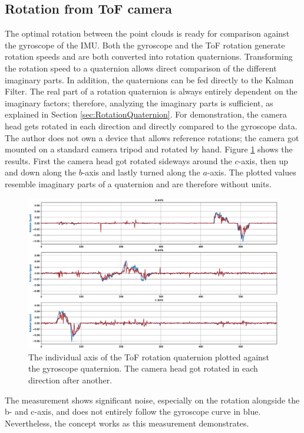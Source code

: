 \subsection{Rotation from ToF camera}
\label{sec:results_tof_rotation}
The optimal rotation between the point clouds is ready for comparison against the gyroscope of the IMU. Both the gyroscope and the ToF rotation generate rotation speeds and are both converted into rotation quaternions. Transforming the rotation speed to a quaternion allows direct comparison of the different imaginary parts. In addition, the quaternions can be fed directly to the Kalman Filter. The real part of a rotation quaternion is always entirely dependent on the imaginary factors; therefore, analyzing the imaginary parts is sufficient, as explained in Section \ref{sec:RotationQuaternion}.
For demonstration, the camera head gets rotated in each direction and directly compared to the gyroscope data. The author does not own a device that allows reference rotations; the camera got mounted on a standard camera tripod and rotated by hand. Figure \ref{im:tof_rotation_measurement} shows the results. First the camera head got rotated sideways around the $c$-axis, then up and down along the $b$-axis and lastly turned along the $a$-axis. The plotted values resemble imaginary parts of a quaternion and are therefore without units.
\begin{figure}[H]
  \centering
  \includegraphics[width=1.0\textwidth]{images/tof_rotation_measurement.eps}
  \caption{The individual axis of the ToF rotation quaternion plotted against the gyroscope quaternion. The camera head got rotated in each direction after another.}
  \label{im:tof_rotation_measurement}
\end{figure}
The measurement shows significant noise, especially on the rotation alongside the b- and c-axis, and does not entirely follow the gyroscope curve in blue. Nevertheless, the concept works as this measurement demonstrates. 
